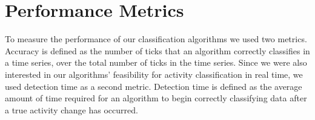 \section{Performance Metrics}
To measure the performance of our classification algorithms we used
two metrics. Accuracy is defined as the number of ticks that an algorithm
correctly classifies in a time series, over the total number of ticks
in the time series. Since we were also interested in our algorithms'
feasibility for activity classification in real time, we used detection time as
a second metric. Detection time is defined as the average amount of time
required for an algorithm to begin correctly classifying data after a
true activity change has occurred.




